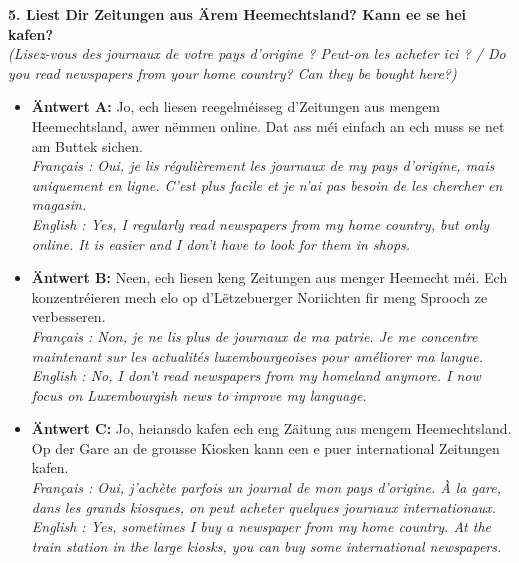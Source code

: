 \noindent\textbf{5. Liest Dir Zeitungen aus Ärem Heemechtsland? Kann ee se hei kafen?}\\
\textit{(Lisez-vous des journaux de votre pays d'origine ? Peut-on les acheter ici ? / Do you read newspapers from your home country? Can they be bought here?)}
\begin{itemize}
    \item \textbf{Äntwert A:} Jo, ech liesen reegelméisseg d'Zeitungen aus mengem Heemechtsland, awer nëmmen online. Dat ass méi einfach an ech muss se net am Buttek sichen.\\
    \textit{Français : Oui, je lis régulièrement les journaux de my pays d'origine, mais uniquement en ligne. C'est plus facile et je n'ai pas besoin de les chercher en magasin.}\\
    \textit{English : Yes, I regularly read newspapers from my home country, but only online. It is easier and I don't have to look for them in shops.}
    \item \textbf{Äntwert B:} Neen, ech liesen keng Zeitungen aus menger Heemecht méi. Ech konzentréieren mech elo op d'Lëtzebuerger Noriichten fir meng Sprooch ze verbesseren.\\
    \textit{Français : Non, je ne lis plus de journaux de ma patrie. Je me concentre maintenant sur les actualités luxembourgeoises pour améliorer ma langue.}\\
    \textit{English : No, I don't read newspapers from my homeland anymore. I now focus on Luxembourgish news to improve my language.}
    \item \textbf{Äntwert C:} Jo, heiansdo kafen ech eng Zäitung aus mengem Heemechtsland. Op der Gare an de grousse Kiosken kann een e puer international Zeitungen kafen.\\
    \textit{Français : Oui, j'achète parfois un journal de mon pays d'origine. À la gare, dans les grands kiosques, on peut acheter quelques journaux internationaux.}\\
    \textit{English : Yes, sometimes I buy a newspaper from my home country. At the train station in the large kiosks, you can buy some international newspapers.}
\end{itemize}
\vspace{0.5em}

